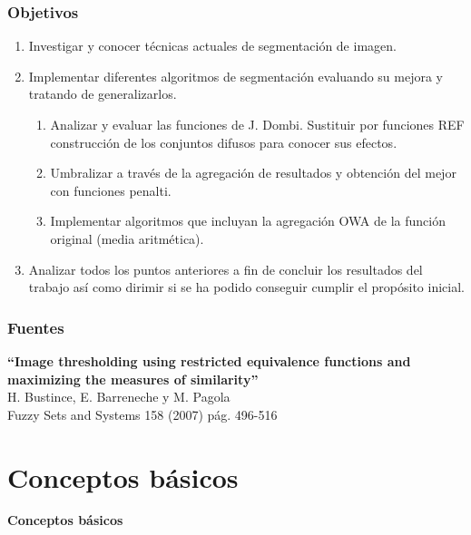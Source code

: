 \documentclass{beamer}
\theoremstyle{plain} %
\theoremstyle{definition}
\begin{document}
\begin{frame}
  \frametitle{Objetivos}
  \begin{enumerate}
    \item Investigar y conocer técnicas actuales de segmentación de imagen.
    \item Implementar diferentes algoritmos de segmentación evaluando su mejora y tratando de generalizarlos.
    \begin{enumerate}
      \item Analizar y evaluar las funciones de J. Dombi. Sustituir por funciones REF construcción de los conjuntos difusos para conocer sus efectos.
      \item Umbralizar a través de la agregación de resultados y obtención del mejor con funciones penalti.
      \item Implementar algoritmos que incluyan la agregación OWA de la función original (media aritmética).
    \end{enumerate}
    \item Analizar todos los puntos anteriores a fin de concluir los resultados del trabajo así como dirimir si se ha podido conseguir cumplir el propósito inicial.
  \end{enumerate}
\end{frame}

\begin{frame}
  \frametitle{Fuentes}
  \begin{center}
  {\bfseries ``Image thresholding using restricted equivalence functions and maximizing the measures of similarity''}\\[5mm]
  H. Bustince, E. Barreneche y M. Pagola\\
  Fuzzy Sets and Systems 158 (2007) pág. 496-516
  \end{center}
\end{frame}


\section{Conceptos básicos}
\begin{frame}
  \bfseries\Large\centering  Conceptos básicos
\end{frame}
\end{document}
